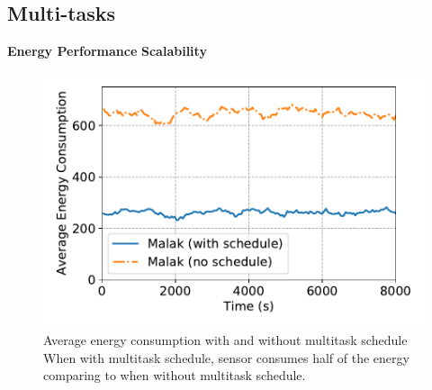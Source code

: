 \subsection{Multi-tasks}
\textbf{Energy Performance}
\textbf{Scalability}
\begin{figure}[htbp]
	\centering
	\includegraphics[width=.85\columnwidth]{Figure/multitask_energy}
	\vspace{-0.1in}
	\caption{Average energy consumption with and without multitask schedule
		\textnormal{When with multitask schedule, sensor consumes half of the energy
			comparing to when without multitask schedule.}}
	\label{multitask_energy}
	\vspace{-0.2in}
\end{figure}
